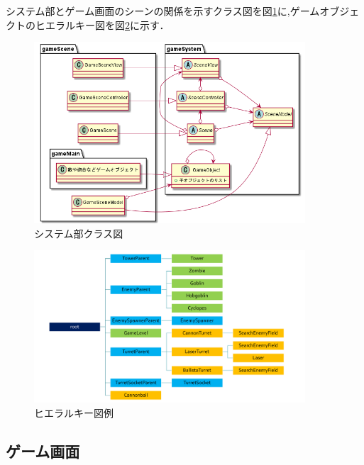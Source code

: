 \documentclass[11pt,a4j]{jarticle}
\begin{document}
システム部とゲーム画面のシーンの関係を示すクラス図を図\ref{fig:Classes}に,ゲームオブジェクトのヒエラルキー図を図\ref{fig:gameSceneHierarchy}に示す．

\begin{figure}[H]
    \begin{center}
        \leavevmode
        \includegraphics[width=0.9\textwidth]{system.png}
        \caption{システム部クラス図}
        \label{fig:Classes}
    \end{center}
\end{figure}

\begin{figure}[H]
    \begin{center}
        \leavevmode
        \includegraphics[width=0.9\textwidth]{hierarchy.pdf}
        \caption{ヒエラルキー図例}
        \label{fig:gameSceneHierarchy}
    \end{center}
\end{figure}

\subsection{ゲーム画面}
\end{document}
